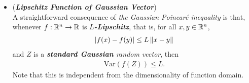 \documentclass[11pt]{article}
\begin{document}
\begin{itemize}
\begin{proof}
\begin{enumerate}
\item Let $K$ denote the \emph{supremum} of \emph{the absolute value} of \emph{the second derivative} of $f$. \emph{Taylor's theorem} implies that, for every $i$,
\begin{align*}
\abs{f\paren{S_n + \frac{1+ \epsilon_i}{\sqrt{n}} }  - f\paren{S_n - \frac{1+ \epsilon_i}{\sqrt{n}} }} &\le \frac{2}{\sqrt{n}}\abs{f'(S_n)} + \frac{2K}{n}
\end{align*}
and therefore
\begin{align*}
\frac{n}{4}\paren{f\paren{S_n + \frac{1+ \epsilon_i}{\sqrt{n}} }  - f\paren{S_n - \frac{1+ \epsilon_i}{\sqrt{n}} }}^2 &\le \paren{f'(S_n)}^2 +\frac{2K}{\sqrt{n}} \abs{f'(S_n)} + \frac{K^2}{n}
\end{align*}
This and \emph{the central limit theorem} imply that
\begin{align*}
\limsup\limits_{n\to \infty}\frac{1}{4}\sum_{i=1}^{n}\E{}{\paren{f\paren{S_n + \frac{1+ \epsilon_i}{\sqrt{n}} }  - f\paren{S_n - \frac{1+ \epsilon_i}{\sqrt{n}} }}^2}
&= \E{}{(f'(Z))^2},
\end{align*} which means that \eqref{ineqn: gaussian_poincare_inequality_step2} leads to \eqref{ineqn: gaussian_poincare_inequality_step1} by letting $n$ go to infinity.  \qed
\end{enumerate}
\end{proof}

\item \begin{remark} (\textbf{\emph{Lipschitz Function of Gaussian Vector}})\\
A straightforward consequence of \emph{the Gaussian Poincar{\'e} inequality} is that, whenever $f: {\mathbb R}^n \to {\mathbb R}$ is \emph{\textbf{$L$-Lipschitz}}, that is, for all $x, y \in {\mathbb R}^n$,
\begin{align*}
\left\lvert f(x) - f(y) \right\rvert \le L\left\|x - y\right\|_{}
\end{align*} and $Z$ is a \emph{\textbf{standard Gaussian} random vector}, then
\begin{align}
\text{Var}(f(Z)) \le L. \label{ineqn: gaussian_variance_lipschitz}
\end{align}
Note that this is independent from the dimensionality of function domain.
\end{remark}
\end{itemize}
\end{document}
